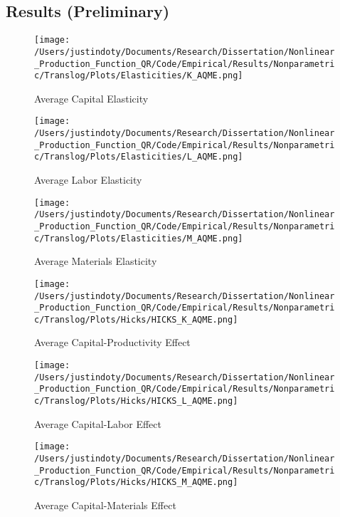 \documentclass{article}
\begin{document}
\subsection{Results (Preliminary)}

\begin{figure}[H]
\centering
\caption{Average Capital Elasticity}
\texttt{[image: /Users/justindoty/Documents/Research/Dissertation/Nonlinear\_Production\_Function\_QR/Code/Empirical/Results/Nonparametric/Translog/Plots/Elasticities/K\_AQME.png]}
\label{kaqme}
\end{figure} 

\begin{figure}[H]
\centering
\caption{Average Labor Elasticity}
\texttt{[image: /Users/justindoty/Documents/Research/Dissertation/Nonlinear\_Production\_Function\_QR/Code/Empirical/Results/Nonparametric/Translog/Plots/Elasticities/L\_AQME.png]}
\label{laqme}
\end{figure} 

\begin{figure}[H]
\centering
\caption{Average Materials Elasticity}
\texttt{[image: /Users/justindoty/Documents/Research/Dissertation/Nonlinear\_Production\_Function\_QR/Code/Empirical/Results/Nonparametric/Translog/Plots/Elasticities/M\_AQME.png]}
\label{maqme}
\end{figure} 


\begin{figure}[H]
\centering
\caption{Average Capital-Productivity Effect}
\texttt{[image: /Users/justindoty/Documents/Research/Dissertation/Nonlinear\_Production\_Function\_QR/Code/Empirical/Results/Nonparametric/Translog/Plots/Hicks/HICKS\_K\_AQME.png]}
\label{hkaqme}
\end{figure} 

\begin{figure}[H]
\centering
\caption{Average Capital-Labor Effect}
\texttt{[image: /Users/justindoty/Documents/Research/Dissertation/Nonlinear\_Production\_Function\_QR/Code/Empirical/Results/Nonparametric/Translog/Plots/Hicks/HICKS\_L\_AQME.png]}
\label{hlaqme}
\end{figure} 

\begin{figure}[H]
\centering
\caption{Average Capital-Materials Effect}
\texttt{[image: /Users/justindoty/Documents/Research/Dissertation/Nonlinear\_Production\_Function\_QR/Code/Empirical/Results/Nonparametric/Translog/Plots/Hicks/HICKS\_M\_AQME.png]}
\label{hmaqme}
\end{figure} 
\end{document}
